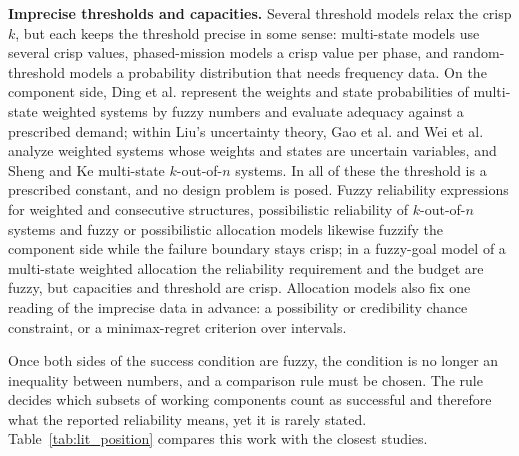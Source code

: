 \documentclass[Review,sagev,times]{sagej}%
\begin{document}
\textbf{Imprecise thresholds and capacities.} Several threshold models relax the crisp $k$, but each keeps
the threshold precise in some sense: multi-state models use several crisp values\cite{Zhuang2022},
phased-mission models a crisp value per phase\cite{WangXingAmari2020,WU2025110678}, and random-threshold
models a probability distribution that needs frequency data\cite{Oszczypala2024}.
On the component side, Ding et al.\cite{DingZuoLisnianski2010} represent the weights and state probabilities
of multi-state weighted systems by fuzzy numbers and evaluate adequacy against a prescribed demand; within
Liu's uncertainty theory, Gao et al.\cite{Gao2018} and Wei et al.\cite{WeiShiZhang2025a,WeiShiZhang2025b}
analyze weighted systems whose weights and states are uncertain variables, and Sheng and Ke\cite{ShengKe2020}
multi-state $k$-out-of-$n$ systems. In all of these the threshold is a prescribed constant, and no design problem is posed. Fuzzy
reliability expressions for weighted and consecutive structures\cite{ChaubeSingh2016,NegiSinghBisht2021,NegiSingh2019},
possibilistic reliability of $k$-out-of-$n$ systems\cite{HuangLiLiu2010} and fuzzy or possibilistic
allocation models\cite{Chebouba2020,Ashraf2019,ZhaoLiu2005,MANECKSHAW2026129956} likewise fuzzify the component
side while the failure boundary stays crisp; in a fuzzy-goal model of a multi-state weighted allocation the
reliability requirement and the budget are fuzzy, but capacities and threshold are crisp\cite{Ebrahimipur2011}.
Allocation models also fix one reading of the imprecise data in advance: a possibility\cite{LiuIwamura1998} or
credibility\cite{Liu2002,HuangJiangYeh2020} chance constraint, or a minimax-regret criterion over
intervals\cite{FeizollahiModarres2012}.

Once both sides of the success condition are fuzzy, the condition is no longer an inequality between numbers,
and a comparison rule must be chosen. The rule decides which subsets of working components count as successful
and therefore what the reported reliability means, yet it is rarely stated. Table~\ref{tab:lit_position}
compares this work with the closest studies.
\end{document}
